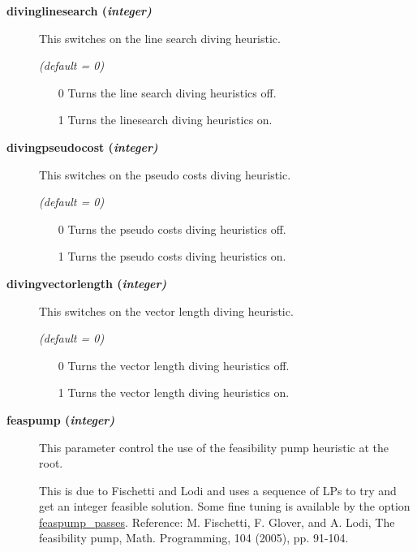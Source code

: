 \begin{description}
\item[\label{divinglinesearch}\hypertarget{divinglinesearch}
{\textbf{divinglinesearch (\slshape{integer})}}]\hspace{1.0in}

This switches on the line search diving heuristic.

\textsl{(default = 0)}
\begin{itemize}
\item[0]
Turns the line search diving heuristics off.
\item[1]
Turns the linesearch diving heuristics on.
\end{itemize}

\item[\label{divingpseudocost}\hypertarget{divingpseudocost}
{\textbf{divingpseudocost (\slshape{integer})}}]\hspace{1.0in}

This switches on the pseudo costs diving heuristic.

\textsl{(default = 0)}
\begin{itemize}
\item[0]
Turns the pseudo costs diving heuristics off.
\item[1]
Turns the pseudo costs diving heuristics on.
\end{itemize}

\item[\label{divingvectorlength}\hypertarget{divingvectorlength}
{\textbf{divingvectorlength (\slshape{integer})}}]\hspace{1.0in}

This switches on the vector length diving heuristic.

\textsl{(default = 0)}
\begin{itemize}
\item[0]
Turns the vector length diving heuristics off.
\item[1]
Turns the vector length diving heuristics on.
\end{itemize}

\item[\label{feaspump}\hypertarget{feaspump}
{\textbf{feaspump (\slshape{integer})}}]\hspace{1.0in}

This parameter control the use of the feasibility pump heuristic at the root.

This is due to Fischetti and Lodi and uses a sequence of LPs to try and get an integer feasible solution.
Some fine tuning is available by the option \hyperlink{feaspump_passes}{feaspump\_passes}.
Reference: M. Fischetti, F. Glover, and A. Lodi, The feasibility pump, Math. Programming, 104 (2005), pp. 91-104.


\end{description}
